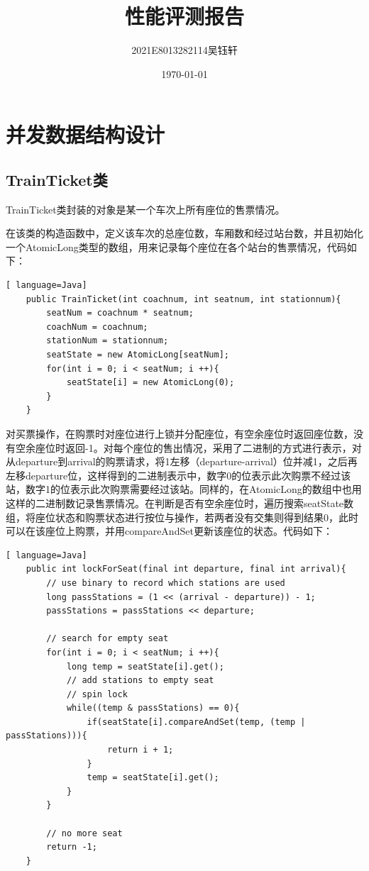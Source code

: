 \documentclass{article}
\title{\zihao{2}\textbf{性能评测报告}}
\author{2021E8013282114\quad 吴钰轩}
\date{\today}
\begin{document}
\maketitle

\section{并发数据结构设计}
\subsection{TrainTicket类}
TrainTicket类封装的对象是某一个车次上所有座位的售票情况。\par
在该类的构造函数中，定义该车次的总座位数，车厢数和经过站台数，并且初始化一个AtomicLong类型的数组，用来记录每个座位在各个站台的售票情况，代码如下：\par
\begin{lstlisting}[ language=Java]
    public TrainTicket(int coachnum, int seatnum, int stationnum){
        seatNum = coachnum * seatnum;
        coachNum = coachnum;
        stationNum = stationnum;
        seatState = new AtomicLong[seatNum];
        for(int i = 0; i < seatNum; i ++){
            seatState[i] = new AtomicLong(0);
        }
    }
\end{lstlisting}\par
对买票操作，在购票时对座位进行上锁并分配座位，有空余座位时返回座位数，没有空余座位时返回-1。对每个座位的售出情况，采用了二进制的方式进行表示，对从departure到arrival的购票请求，将1左移（departure-arrival）位并减1，之后再左移departure位，这样得到的二进制表示中，数字0的位表示此次购票不经过该站，数字1的位表示此次购票需要经过该站。同样的，在AtomicLong的数组中也用这样的二进制数记录售票情况。在判断是否有空余座位时，遍历搜索seatState数组，将座位状态和购票状态进行按位与操作，若两者没有交集则得到结果0，此时可以在该座位上购票，并用compareAndSet更新该座位的状态。代码如下：\par
\begin{lstlisting}[ language=Java]
    public int lockForSeat(final int departure, final int arrival){
        // use binary to record which stations are used
        long passStations = (1 << (arrival - departure)) - 1;
        passStations = passStations << departure;

        // search for empty seat
        for(int i = 0; i < seatNum; i ++){
            long temp = seatState[i].get();
            // add stations to empty seat
            // spin lock
            while((temp & passStations) == 0){
                if(seatState[i].compareAndSet(temp, (temp | passStations))){
                    return i + 1;
                }
                temp = seatState[i].get();
            }
        }

        // no more seat
        return -1;
    }
\end{lstlisting}\par
\end{document}
